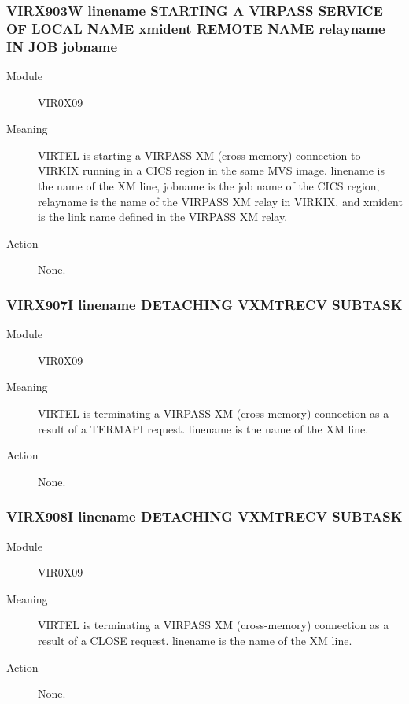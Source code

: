 \documentclass[letterpaper,10pt,english]{sphinxmanual}
\begin{document}
\subsubsection{VIRX903W linename STARTING A VIRPASS SERVICE OF LOCAL NAME xmident REMOTE NAME relayname IN JOB jobname}
\label{\detokenize{messages:virx903w-linename-starting-a-virpass-service-of-local-name-xmident-remote-name-relayname-in-job-jobname}}\begin{description}
\item[{Module}] \leavevmode
VIR0X09

\item[{Meaning}] \leavevmode
VIRTEL is starting a VIRPASS XM (cross-memory) connection to VIRKIX running in a CICS region in the same MVS image. linename is the name of the XM line, jobname is the job name of the CICS region, relayname is the name of the VIRPASS XM relay in VIRKIX, and xmident is the link name defined in the VIRPASS XM relay.

\item[{Action}] \leavevmode
None.

\end{description}


\subsubsection{VIRX907I linename DETACHING VXMTRECV SUBTASK}
\label{\detokenize{messages:virx907i-linename-detaching-vxmtrecv-subtask}}\begin{description}
\item[{Module}] \leavevmode
VIR0X09

\item[{Meaning}] \leavevmode
VIRTEL is terminating a VIRPASS XM (cross-memory) connection as a result of a TERMAPI request. linename is the name of the XM line.

\item[{Action}] \leavevmode
None.

\end{description}


\subsubsection{VIRX908I linename DETACHING VXMTRECV SUBTASK}
\label{\detokenize{messages:virx908i-linename-detaching-vxmtrecv-subtask}}\begin{description}
\item[{Module}] \leavevmode
VIR0X09

\item[{Meaning}] \leavevmode
VIRTEL is terminating a VIRPASS XM (cross-memory) connection as a result of a CLOSE request. linename is the name of the XM line.

\item[{Action}] \leavevmode
None.

\end{description}
\end{document}
